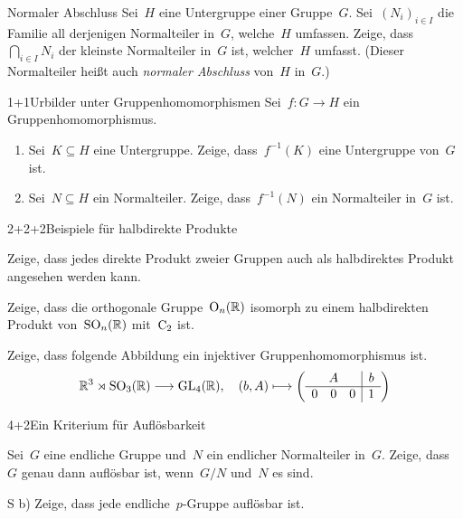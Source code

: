 \documentclass{algblatt}
\begin{document}

\begin{aufgabe}{2}{Normaler Abschluss}
Sei~$H$ eine Untergruppe einer Gruppe~$G$. Sei~$(N_i)_{i \in I}$ die Familie
all derjenigen Normalteiler in~$G$, welche~$H$ umfassen. Zeige,
dass~$\bigcap_{i \in I} N_i$ der kleinste Normalteiler in~$G$ ist, welcher~$H$
umfasst. (Dieser Normalteiler heißt auch \emph{normaler Abschluss} von~$H$
in~$G.$)
\end{aufgabe}

\begin{aufgabe}{1+1}{Urbilder unter Gruppenhomomorphismen}
Sei~$f : G \to H$ ein Gruppenhomomorphismus.
\begin{enumerate}
\item Sei~$K \subseteq H$ eine Untergruppe. Zeige, dass~$f^{-1}(K)$
eine Untergruppe von~$G$ ist.
\item Sei~$N \subseteq H$ ein Normalteiler. Zeige, dass~$f^{-1}(N)$
ein Normalteiler in~$G$ ist.
\end{enumerate}
\end{aufgabe}

\begin{aufgabeE}{2+2+2}{Beispiele für halbdirekte Produkte}
\item Zeige, dass jedes direkte Produkt zweier Gruppen auch als halbdirektes
Produkt angesehen werden kann.
\item Zeige, dass die orthogonale Gruppe~$\mathrm{O}_n(\mathbb{R})$ isomorph zu einem
halbdirekten Produkt von~$\mathrm{SO}_n(\mathbb{R})$ mit~$\mathrm{C}_2$ ist.
\item Zeige, dass folgende Abbildung ein injektiver Gruppenhomomorphismus ist.
\[ \RR^3 \rtimes \SO_3(\RR) \longrightarrow \GL_4(\RR),\quad
  (b, A) \longmapsto \left(\begin{array}{ccc|c}
    \multicolumn{3}{c|}{A} & b \\\hline
    0 & 0 & 0 & 1
  \end{array}\right) \]
\end{aufgabeE}
\vspace{-1em}

\begin{aufgabeE}{4+2}{Ein Kriterium für Auflösbarkeit}
\item Sei~$G$ eine endliche Gruppe und~$N$ ein endlicher Normalteiler in~$G$.
Zeige, dass~$G$ genau dann auflösbar ist, wenn~$G/N$ und~$N$ es sind.
\item[S b)] Zeige, dass jede endliche~$p$-Gruppe auflösbar ist.
\end{aufgabeE}
\end{document}
